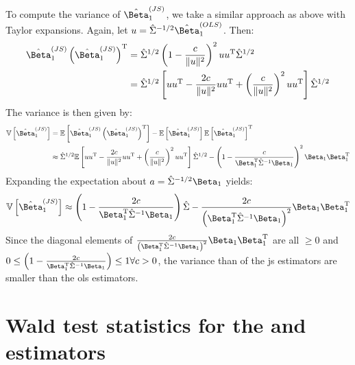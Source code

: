 To compute the variance of $\hat{\Beta}_1^{(JS)}$, we take a similar approach as above with Taylor expansions.
Again, let $u = \hat{\Sigma}^{-1/2} \hat{\Beta}_1^{(OLS)}$.
Then:
%
\begin{align}
  \hat{\Beta}_1^{(JS)} \left( \hat{\Beta}_1^{(JS)} \right)^\tran  & = \hat{\Sigma}^{1/2} \left( 1 - \frac{c}{\Vert u \Vert ^2} \right)^2 u u^\tran \hat{\Sigma}^{1/2}                                                                \\
                                                                  & = \hat{\Sigma}^{1/2} \left[ u u^\tran - \frac{2c}{\Vert u \Vert ^2} u u^\tran + \left( \frac{c}{\Vert u \Vert ^2} \right)^2 u u^\tran \right] \hat{\Sigma}^{1/2}
\end{align}
%
The variance is then given by:
%
\begin{align}
  \variance{ \hat{\Beta}_1^{(JS)} } & = \expect{ \hat{\Beta}_1^{(JS)} \left( \hat{\Beta}_1^{(JS)} \right)^\tran } - \expect{ \hat{\Beta}_1^{(JS)} } \expect{ \hat{\Beta}_1^{(JS)} }^\tran                \\
                                    & \approx \hat{\Sigma}^{1/2} \expect{ u u^\tran - \frac{2c}{\Vert u \Vert ^2} u u^\tran + \left( \frac{c}{\Vert u \Vert ^2} \right)^2 u u^\tran } \hat{\Sigma}^{1/2}
  - \left(1 - \frac{c}{\Beta_1^\tran \hat{\Sigma}^{-1} \Beta_1} \right)^2 \Beta_1 \Beta_1^\tran
\end{align}
%
Expanding the expectation about $a = \hat{\Sigma}^{-1/2} \Beta_1$ yields:
%
\begin{equation}
  \variance{ \hat{\Beta}_1^{(JS)} }
  \approx \left(1 - \frac{2c}{\Beta_1^\tran \hat{\Sigma}^{-1} \Beta_1} \right) \hat{\Sigma}
  - \frac{2c}{\left( \Beta_1^\tran \hat{\Sigma}^{-1} \Beta_1 \right)^2} \Beta_1 \Beta_1^\tran
\end{equation}
%
Since the diagonal elements of $\frac{2c}{\left( \Beta_1^\tran \hat{\Sigma}^{-1} \Beta_1 \right)^2} \Beta_1 \Beta_1^\tran$ are all $\ge 0$ and $0 \le \left(1 - \frac{2c}{\Beta_1^\tran \hat{\Sigma}^{-1} \Beta_1} \right) \le 1 \forall c > 0$, the variance than of the \gls{js} estimators are smaller than the \gls{ols} estimators.

\section{Wald test statistics for the  and  estimators}

